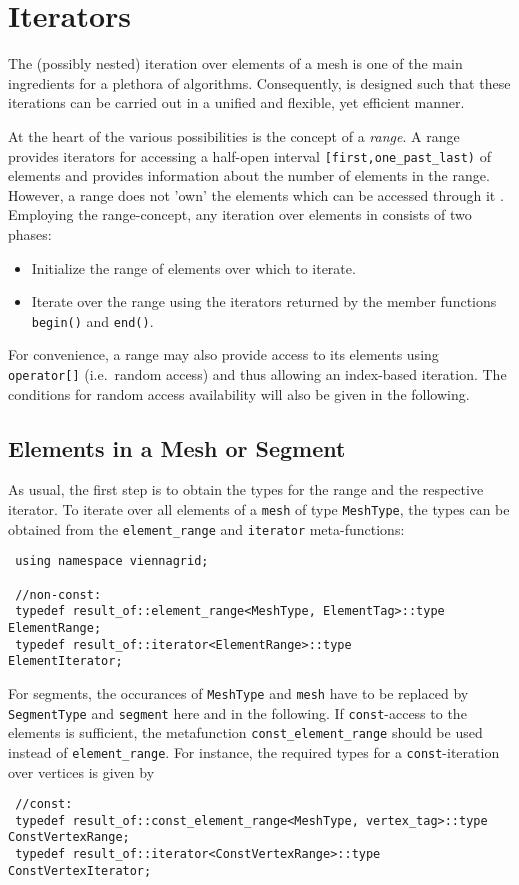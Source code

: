 \chapter{Iterators} \label{chap:iterators}

The (possibly nested) iteration over elements of a mesh is one of the main ingredients for a plethora of algorithms.
Consequently, {\ViennaGrid} is designed such that these iterations can be carried out in a unified and flexible, yet efficient manner.

At the heart of the various possibilities is the concept of a \emph{range}. A range provides iterators for accessing a half-open interval \texttt{[first,one\_past\_last)} of elements and provides information about the number of elements in the range. However, a range does not 'own' the elements which can be accessed through it \cite{boost}.
Employing the range-concept, any iteration over elements in {\ViennaGrid} consists of two phases:
\begin{itemize}
 \item Initialize the range of elements over which to iterate.
 \item Iterate over the range using the iterators returned by the member functions \lstinline|begin()| and \lstinline|end()|.
\end{itemize}

For convenience, a range may also provide access to its elements using \lstinline|operator[]| (i.e.~random access) and thus allowing an index-based iteration. The conditions for random access availability will also be given in the following.


\section{Elements in a Mesh or Segment}
As usual, the first step is to obtain the types for the range and the respective iterator.
To iterate over all elements of a \lstinline|mesh| of type \lstinline|MeshType|, the types can be obtained from the \lstinline|element_range| and \lstinline|iterator| meta-functions:
\begin{lstlisting}
 using namespace viennagrid;

 //non-const:
 typedef result_of::element_range<MeshType, ElementTag>::type ElementRange;
 typedef result_of::iterator<ElementRange>::type                ElementIterator;
\end{lstlisting}
For segments, the occurances of \lstinline|MeshType| and \lstinline|mesh| have to be replaced by \lstinline|SegmentType| and \lstinline|segment| here and in the following.
If \lstinline|const|-access to the elements is sufficient, the metafunction \lstinline|const_element_range| should be used instead of \lstinline|element_range|.
For instance, the required types for a \lstinline|const|-iteration over vertices is given by
\begin{lstlisting}
 //const:
 typedef result_of::const_element_range<MeshType, vertex_tag>::type   ConstVertexRange;
 typedef result_of::iterator<ConstVertexRange>::type         ConstVertexIterator;
\end{lstlisting}

